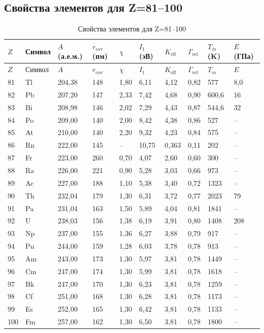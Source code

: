 \documentclass[12pt,a4paper]{article}
\newcommand{\Keff}{K_{\mathrm{eff}}}
\begin{document}
	\subsection*{Свойства элементов для Z=81–100}
	
	\begin{longtable}{p{0.6cm}p{1.2cm}p{1.2cm}p{1.2cm}p{1.2cm}p{1.2cm}p{1.5cm}p{1.2cm}p{1.2cm}p{1.2cm}}
		\caption{Свойства элементов для Z=81–100} \label{tab:elem-data-81to100} \\
		\toprule
		\(Z\) & Символ & \(A\) (а.е.м.) & \(r_{\text{cov}}\) (пм) & \(\chi\) & \(I_1\) (эВ) & \(\Keff\) & \(\Gamma_{\text{rel}}\) & \(T_m\) (K) & \(E\) (ГПа) \\
		\midrule
		\endfirsthead
		\toprule
		\(Z\) & Символ & \(A\) & \(r_{\text{cov}}\) & \(\chi\) & \(I_1\) & \(\Keff\) & \(\Gamma_{\text{rel}}\) & \(T_m\) & \(E\) \\
		\midrule
		\endhead
		81 & Tl & 204,38 & 148 & 1,80 & 6,11 & 4,12 & 0,82 & 577 & 8,0 \\
		82 & Pb & 207,20 & 147 & 2,33 & 7,42 & 4,68 & 0,90 & 600,6 & 16 \\
		83 & Bi & 208,98 & 146 & 2,02 & 7,29 & 4,43 & 0,87 & 544,6 & 32 \\
		84 & Po & 209,00 & 140 & 2,00 & 8,42 & 4,38 & 0,86 & 527 & – \\
		85 & At & 210,00 & 140 & 2,20 & 9,32 & 4,23 & 0,84 & 575 & – \\
		86 & Rn & 222,00 & 145 & –    & 10,75 & 0,363 & 0,11 & 202 & – \\
		87 & Fr & 223,00 & 260 & 0,70 & 4,07 & 2,60 & 0,60 & 300 & – \\
		88 & Ra & 226,00 & 221 & 0,90 & 5,28 & 3,03 & 0,66 & 973 & – \\
		89 & Ac & 227,00 & 188 & 1,10 & 5,38 & 3,40 & 0,72 & 1323 & – \\
		90 & Th & 232,04 & 179 & 1,30 & 6,31 & 3,72 & 0,77 & 2023 & 79 \\
		91 & Pa & 231,04 & 163 & 1,50 & 5,89 & 4,04 & 0,81 & 1841 & – \\
		92 & U  & 238,03 & 156 & 1,38 & 6,19 & 3,91 & 0,80 & 1408 & 208 \\
		93 & Np & 237,00 & 155 & 1,36 & 6,27 & 3,88 & 0,79 & 917 & – \\
		94 & Pu & 244,00 & 159 & 1,28 & 6,03 & 3,78 & 0,78 & 913 & – \\
		95 & Am & 243,00 & 173 & 1,30 & 5,97 & 3,81 & 0,78 & 1449 & – \\
		96 & Cm & 247,00 & 174 & 1,30 & 5,99 & 3,81 & 0,78 & 1618 & – \\
		97 & Bk & 247,00 & 170 & 1,30 & 6,23 & 3,81 & 0,78 & 1259 & – \\
		98 & Cf & 251,00 & 168 & 1,30 & 6,28 & 3,81 & 0,78 & 1173 & – \\
		99 & Es & 252,00 & 165 & 1,30 & 6,42 & 3,81 & 0,78 & 1133 & – \\
		100& Fm & 257,00 & 162 & 1,30 & 6,50 & 3,81 & 0,78 & 1800 & – \\
		\bottomrule
	\end{longtable}
\end{document}
